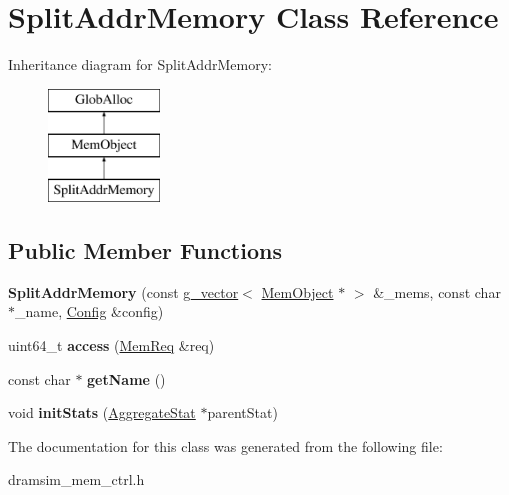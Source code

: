 \hypertarget{classSplitAddrMemory}{\section{Split\-Addr\-Memory Class Reference}
\label{classSplitAddrMemory}
}
Inheritance diagram for Split\-Addr\-Memory\-:\begin{figure}[H]
\begin{center}
\leavevmode
\includegraphics[height=3.000000cm]{classSplitAddrMemory}
\end{center}
\end{figure}
\subsection*{Public Member Functions}
\begin{DoxyCompactItemize}
\item 
\hypertarget{classSplitAddrMemory_af90634aead2cb42fb7c5da49e00f7c2b}{{\bfseries Split\-Addr\-Memory} (const \hyperlink{classg__vector}{g\-\_\-vector}$<$ \hyperlink{classMemObject}{Mem\-Object} $\ast$ $>$ \&\-\_\-mems, const char $\ast$\-\_\-name, \hyperlink{classConfig}{Config} \&config)}\label{classSplitAddrMemory_af90634aead2cb42fb7c5da49e00f7c2b}

\item 
\hypertarget{classSplitAddrMemory_aaaae1b167da3dfe97dbf32dbb832d3eb}{uint64\-\_\-t {\bfseries access} (\hyperlink{structMemReq}{Mem\-Req} \&req)}\label{classSplitAddrMemory_aaaae1b167da3dfe97dbf32dbb832d3eb}

\item 
\hypertarget{classSplitAddrMemory_ae2d82498e1e28fcd5c7e3f292242bd82}{const char $\ast$ {\bfseries get\-Name} ()}\label{classSplitAddrMemory_ae2d82498e1e28fcd5c7e3f292242bd82}

\item 
\hypertarget{classSplitAddrMemory_a5f1a6703cae8a559bf8e084dde47aa48}{void {\bfseries init\-Stats} (\hyperlink{classAggregateStat}{Aggregate\-Stat} $\ast$parent\-Stat)}\label{classSplitAddrMemory_a5f1a6703cae8a559bf8e084dde47aa48}

\end{DoxyCompactItemize}


The documentation for this class was generated from the following file\-:\begin{DoxyCompactItemize}
\item 
dramsim\-\_\-mem\-\_\-ctrl.\-h\end{DoxyCompactItemize}

